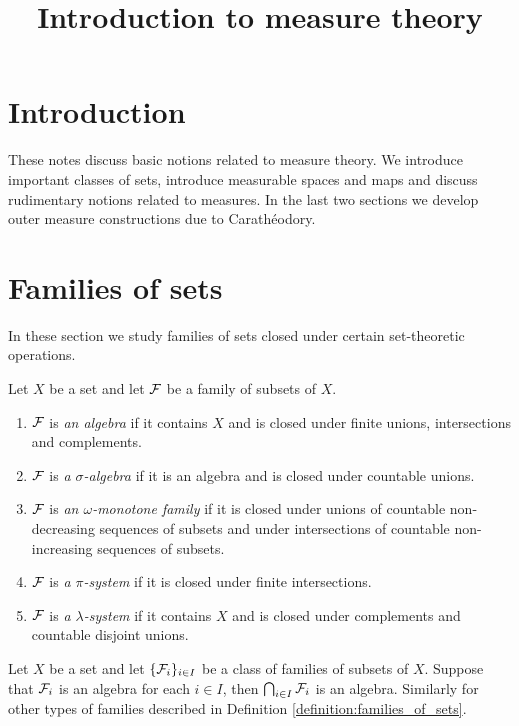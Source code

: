 



\title{Introduction to measure theory}
\date{}
\maketitle

\section{Introduction}
\noindent
These notes discuss basic notions related to measure theory. We introduce important classes of sets, introduce measurable spaces and maps and discuss rudimentary notions related to measures. In the last two sections we develop outer measure constructions due to Carath{\'e}odory.

\section{Families of sets}
\noindent
In these section we study families of sets closed under certain set-theoretic operations.

\begin{definition}\label{definition:families_of_sets}
Let $X$ be a set and let ${\mathcal F}$ be a family of subsets of $X$. 
\begin{enumerate}[label=\textbf{(\arabic*)}, leftmargin=*]
\item ${\mathcal F}$ is \textit{an algebra} if it contains $X$ and is closed under finite unions, intersections and complements. 
\item ${\mathcal F}$ is \textit{a $\sigma$-algebra} if it is an algebra and is closed under countable unions.
\item ${\mathcal F}$ is \textit{an $\omega$-monotone family} if it is closed under unions of countable non-decreasing sequences of subsets and under intersections of countable non-increasing sequences of subsets.
\item ${\mathcal F}$ is \textit{a $\pi$-system} if it is closed under finite intersections.
\item ${\mathcal F}$ is \textit{a $\lambda$-system} if it contains $X$ and is closed under complements and countable disjoint unions. 
\end{enumerate}
\end{definition}

\begin{remark}\label{remark:intersections}
Let $X$ be a set and let $\{{\mathcal F}_i\}_{i\in I}$ be a class of families of subsets of $X$. Suppose that ${\mathcal F}_i$ is an algebra for each $i \in I$, then $\bigcap_{i\in I}{\mathcal F}_i$ is an algebra. Similarly for other types of families described in Definition \ref{definition:families_of_sets}.
\end{remark}

